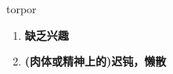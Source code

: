 
\begin{frame}
{\huge torpor}
\begin{center}
\begin{enumerate}\Large
  \item \textbf{缺乏兴趣}
  \item \textbf{(肉体或精神上的)迟钝，懒散}
\end{enumerate}
\end{center}
\end{frame}
